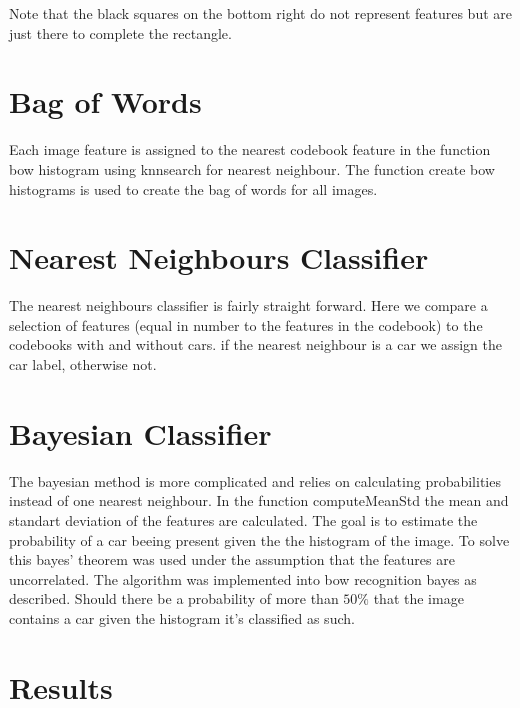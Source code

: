 \documentclass[12pt]{article}
\begin{document}
Note that the black squares on the bottom right do not represent features but are just there to complete the rectangle.

\section{Bag of Words}

Each image feature is assigned to the nearest codebook feature in the function bow histogram using knnsearch for nearest neighbour. The function create bow histograms is used to create the bag of words for all images.



\section{Nearest Neighbours Classifier}

The nearest neighbours classifier is fairly straight forward. Here we compare a selection of features (equal in number to the features in the codebook) to the codebooks with and without cars. if the nearest neighbour is a car we assign the car label, otherwise not. 

\section{Bayesian Classifier}
The bayesian method is more complicated and relies on calculating probabilities instead of one nearest neighbour. In the function computeMeanStd the mean and standart deviation of the features are calculated. The goal is to estimate the probability of a car beeing present given the the histogram of the image. To solve this bayes' theorem was used under the assumption that the features are uncorrelated. The algorithm was implemented into bow recognition bayes as described. Should there be a probability of more than $50\%$ that the image contains a car given the histogram it's classified as such. 

\section{Results}
\end{document}
